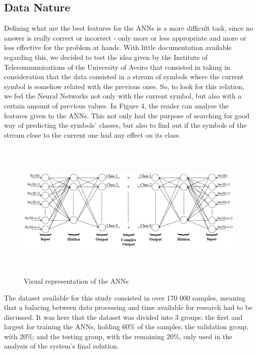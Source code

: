 \documentclass[10pt]{IEEEtran}
\begin{document}
\subsection{Data Nature}
Defining what are the best features for the ANNs is a more difficult task, since no answer is really correct or incorrect - only more or less appropriate and more or less effective for the problem at hands. 
With little documentation available regarding this, we decided to test the idea given by the Institute of Telecommunications of the University of Aveiro that consisted in taking in consideration that the data consisted in a stream of symbols where the current symbol is somehow related with the previous ones. So, to look for this relation, we fed the Neural Networks not only with the current symbol, but also with a certain amount of previous values. In Figure 4, the reader can analyse the features given to the ANNs.
This not only had the purpose of searching for good way of predicting the symbols' classes, but also to find out if the symbols of the stream close to the current one had any effect on its class. 

\begin{figure}[h]
\centering
\includegraphics[width=\textwidth, height=6.8cm]{figure4.jpg}
\caption{Visual representation of the ANNs}
\end{figure}

The dataset available for this study consisted in over 170 000 samples, meaning that a balacing between data processing and time available for research had to be discussed. It was here that the dataset was divided into 3 groups: the first and largest for training the ANNs, holding 60\% of the samples; the validation group, with 20\%; and the testing group, with the remaining 20\%, only used in the analysis of the system's final solution.
\end{document}
